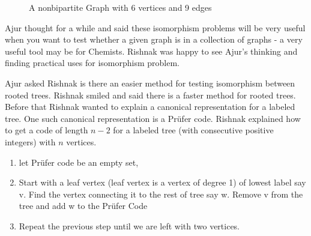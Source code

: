 \begin{figure}

\caption{ A nonbipartite Graph with 6 vertices and 9 edges}\label{8g4}

\end{figure}

Ajur thought for a while and said these isomorphism problems will be very useful when you want to test whether a given graph is in a collection of graphs - a very useful tool may be for Chemists. Rishnak was happy to see Ajur's thinking and finding practical uses for isomorphism problem. 

Ajur asked Rishnak is there an easier method for testing isomorphism between rooted trees. Rishnak smiled and said there is a faster method for rooted trees. Before that Rishnak wanted to explain a canonical representation for a labeled tree. One such canonical representation is a Pr{\"u}fer code. Rishnak explained how to get a code of length $n-2$ for a labeled tree (with consecutive positive integers) with  $n$ vertices.

\begin{enumerate}
\item let Pr{\"u}fer code be an empty set,

\item Start with a leaf vertex (leaf vertex is a vertex of degree 1) of lowest label say v. Find the vertex connecting it to the rest of tree say w.  Remove v from the tree and add w to the Pr{\"u}fer Code
 
\item Repeat the previous step until we are left with two vertices.
\end{enumerate}

